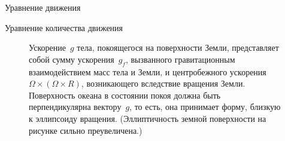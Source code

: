 \begin{chapter}{Уравнение движения}
\begin{section}{Уравнение количества движения}
\begin{figure}[h!]
\caption{Ускорение~$g$ тела, покоящегося на поверхности Земли, представляет
собой сумму ускорения~$g_f$, вызванного гравитационным взаимодействием масс
тела и Земли, и центробежного ускорения~$\Omega\times(\Omega\times{R})$, 
возникающего вследствие вращения Земли. Поверхность океана в состоянии покоя
должна быть перпендикулярна вектору~$g$, то есть, она принимает форму, близкую
к эллипсоиду вращения. (Эллиптичность земной поверхности на рисунке сильно
преувеличена.)
}
\label{fig:gravitysketch}
\end{figure}
%
\end{section}


\end{chapter}
